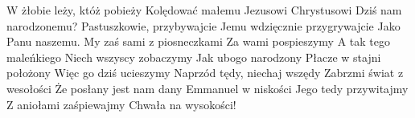 \beginverse
W żłobie leży, któż pobieży
Kolędować małemu
Jezusowi Chrystusowi
Dziś nam narodzonemu?
Pastuszkowie, przybywajcie
Jemu wdzięcznie przygrywajcie
Jako Panu naszemu.
\endverse
\beginverse
My zaś sami z piosneczkami
Za wami pospieszymy
A tak tego maleńkiego
Niech wszyscy zobaczymy
Jak ubogo narodzony
Płacze w stajni położony
Więc go dziś ucieszymy
\endverse
\beginverse
Naprzód tędy, niechaj wszędy
Zabrzmi świat z wesołości
Że posłany jest nam dany
Emmanuel w niskości
Jego tedy przywitajmy
Z aniołami zaśpiewajmy
Chwała na wysokości!
\endverse
\endsong
